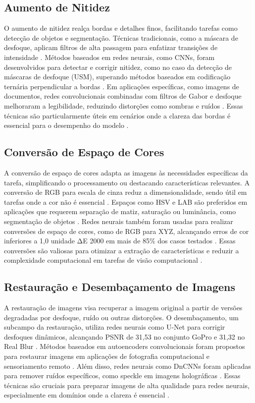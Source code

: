 \subsection{Aumento de Nitidez}
O aumento de nitidez realça bordas e detalhes finos, facilitando tarefas como detecção de objetos e segmentação. Técnicas tradicionais, como a máscara de desfoque, aplicam filtros de alta passagem para enfatizar transições de intensidade \cite{sciencedirect2023normalization}. Métodos baseados em redes neurais, como CNNs, foram desenvolvidos para detectar e corrigir nitidez, como no caso da detecção de máscaras de desfoque (USM), superando métodos baseados em codificação ternária perpendicular a bordas \cite{ding2018detecting}. Em aplicações específicas, como imagens de documentos, redes convolucionais combinadas com filtros de Gabor e desfoque melhoraram a legibilidade, reduzindo distorções como sombras e ruídos \cite{ben2022deep}. Essas técnicas são particularmente úteis em cenários onde a clareza das bordas é essencial para o desempenho do modelo \cite{sharma2024deep}.

\subsection{Conversão de Espaço de Cores}
A conversão de espaço de cores adapta as imagens às necessidades específicas da tarefa, simplificando o processamento ou destacando características relevantes. A conversão de RGB para escala de cinza reduz a dimensionalidade, sendo útil em tarefas onde a cor não é essencial \cite{sharma2024deep}. Espaços como HSV e LAB são preferidos em aplicações que requerem separação de matiz, saturação ou luminância, como segmentação de objetos \cite{sharma2024deep}. Redes neurais também foram usadas para realizar conversões de espaço de cores, como de RGB para XYZ, alcançando erros de cor inferiores a 1,0 unidade ΔE 2000 em mais de 85\% dos casos testados \cite{macdonald2019color}. Essas conversões são valiosas para otimizar a extração de características e reduzir a complexidade computacional em tarefas de visão computacional \cite{sharma2024deep}.

\subsection{Restauração e Desembaçamento de Imagens}
A restauração de imagens visa recuperar a imagem original a partir de versões degradadas por desfoque, ruído ou outras distorções. O desembaçamento, um subcampo da restauração, utiliza redes neurais como U-Net para corrigir desfoques dinâmicos, alcançando PSNR de 31,53 no conjunto GoPro e 31,32 no Real Blur \cite{chen2023image}. Métodos baseados em autoencoders convolucionais foram propostos para restaurar imagens em aplicações de fotografia computacional e sensoriamento remoto \cite{barreto2020cnn}. Além disso, redes neurais como DnCNNs foram aplicadas para remover ruídos específicos, como speckle em imagens holográficas \cite{sharma2024deep}. Essas técnicas são cruciais para preparar imagens de alta qualidade para redes neurais, especialmente em domínios onde a clareza é essencial \cite{sumida2019deep}.

